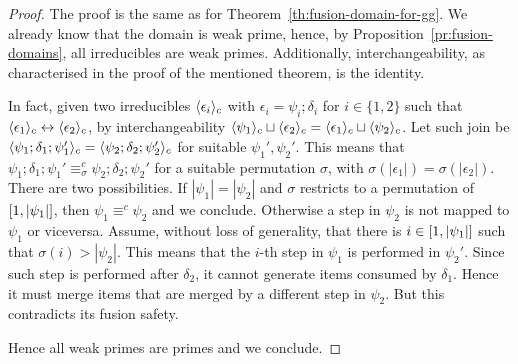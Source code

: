 \begin{proof}
  The proof is the same as for
  Theorem~\ref{th:fusion-domain-for-gg}. We already know that the
  domain is weak prime, hence, by Proposition~\ref{pr:fusion-domains},
  all irreducibles are weak primes.  Additionally, interchangeability,
  as characterised in the proof of the mentioned theorem, is the
  identity.


  In fact, given two irreducibles $\langle {\epsilon_i}\rangle_c$ with
  $\epsilon_i = \psi_i; \delta_i$ for $i \in \{1,2\}$ such that
  $\langle {\epsilon_1}\rangle_c \leftrightarrow \langle {\epsilon_2}\rangle_c$, by
  interchangeability
  $\langle {\psi_1}\rangle_c \sqcup \langle {\epsilon_2}\rangle_c =
  \langle {\epsilon_1}\rangle_c \sqcup \langle {\psi_2}\rangle_c$. Let such join be
  $\langle {\psi_1; \delta_1; \psi_1'}\rangle_c = \langle {\psi_2; \delta_2;
    \psi_2'}\rangle_c$ for suitable $\psi_1', \psi_2'$. This means that
  $\psi_1; \delta_1; \psi_1' \equiv^c_\sigma \psi_2; \delta_2;
  \psi_2'$ for a suitable permutation $\sigma$, with
  $\sigma(|\epsilon_1|) = \sigma(|\epsilon_2|)$. There are two
  possibilities. If $|\psi_1| = |\psi_2|$ and $\sigma$ restricts to a
  permutation of $[{1},{|\psi_1|}]$, then $\psi_1 \equiv^c \psi_2$
  and we conclude. Otherwise a step in $\psi_2$ is not mapped
  to $\psi_1$ or viceversa. Assume, without loss of generality, that
  there is $i \in [{1},{|\psi_1|}]$ such that
  $\sigma(i) > |\psi_2|$. This means that the $i$-th step in $\psi_1$
  is performed in $\psi_2'$. Since such step is performed after
  $\delta_2$, it cannot generate items consumed by $\delta_1$. Hence
  it must merge items that are merged by a different step in
  $\psi_2$. But this contradicts its fusion safety.

  \smallskip
  
  Hence all weak primes are primes and we
  conclude.
\end{proof}





